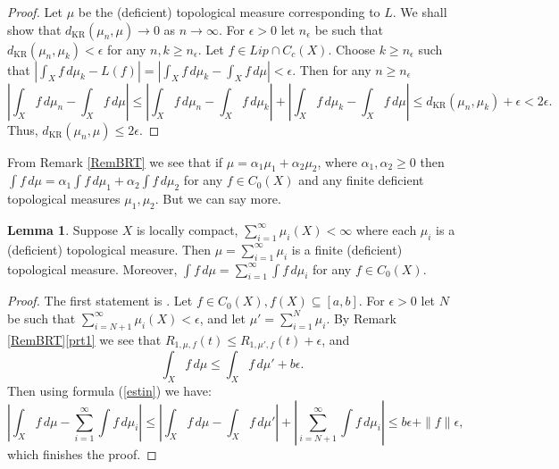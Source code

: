 \documentclass[sn-mathphys-num]{sn-jnl}%
\theoremstyle{thmstyleone}%
\theoremstyle{definition}
\newtheorem{lemma}[theorem]{Lemma}
\begin{document}
\begin{proof}
Let $ \mu$ be the (deficient) topological measure corresponding to $L$.
We shall show that  $d_{\text{KR}}(\mu_n, \mu) \rightarrow 0$ as $ n \rightarrow \infty$.
For $ \epsilon >0$ let $n_\epsilon$ be such that $d_{\text{KR}}(\mu_n, \mu_k) < \epsilon$ for any $n,k \ge n_\epsilon$.
Let $f \in Lip \cap C_c(X)$.
Choose $k \ge n_\epsilon$ such that $  | \int_X f \, d\mu_k- L(f)| =  | \int_X f \, d\mu_k- \int_X f\, d \mu| < \epsilon.$ Then for any $n \ge n_\epsilon$ 
$$  |  \int_X f \, d\mu_n - \int_X f\, d \mu |  \le  | \int_X f \, d\mu_n - \int_X f\, d \mu_k | +  | \int_X f \, d\mu_k - \int_X f\, d \mu |   
\le d_{\text{KR}}(\mu_n, \mu_k) + \epsilon < 2 \epsilon.
$$
Thus, $d_{\text{KR}}(\mu_n, \mu) \le 2 \epsilon$.
\end{proof}

From Remark \ref{RemBRT} we see that if $\mu = \alpha_1 \mu_1 + \alpha_2 \mu_2$, where $\alpha_1, \alpha_2 \ge 0$ 
then $ \int f \, d\mu = \alpha_1  \int f \, d\mu_1 +  \alpha_2  \int f \, d\mu_2$ for any $ f \in C_0(X)$ 
and any finite deficient topological measures $\mu_1, \mu_2$. But we can say more. 
  
\begin{lemma} \label{inftsumD}
Suppose $X$ is locally compact,  $\sum_{i=1}^\infty \mu_i(X) < \infty$ where each $\mu_i$ is a (deficient) topological measure. 
Then $\mu = \sum_{i=1}^\infty \mu_i$ is a finite (deficient) topological measure. 
Moreover, $ \int f \, d \mu = \sum_{i=1}^\infty  \int f\, d \mu_i$ for any $ f \in C_0(X)$.
\end{lemma}

\begin{proof}
The first statement is \cite[L. 5.1]{Butler:WkConv}. Let $ f \in C_0(X), f(X) \subseteq [a,b]$. 
For $ \epsilon >0$ let $N$ be such that
$\sum_{i=N+1}^\infty \mu_i(X) < \epsilon$, and let $\mu' = \sum_{i=1}^N \mu_i$.  By Remark \ref{RemBRT}\ref{prt1} we see that 
$R_{1, \mu, f}(t) \le R_{1, \mu', f}(t) + \epsilon$, and  
$$  \int_X f \, d\mu \le  \int_X f \, d\mu'  + b \epsilon. $$
Then using formula (\ref{estin}) we have:
$$ | \int_X f \, d\mu -  \sum_{i=1}^\infty  \int f\, d \mu_i |  \le |  \int_X f \, d\mu -  \int_X f \, d\mu' |  + | \sum_{i=N+1}^\infty  \int f\, d \mu_i | 
 \le b \epsilon + \| f \| \epsilon, $$
which finishes the proof.
\end{proof}
\end{document}
